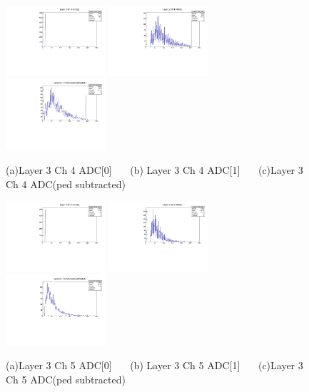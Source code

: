 \documentclass[a4paper,11pt]{article}
\theoremstyle{mytheor}
\begin{document}
\begin{figure}[H] 
\vspace*{-0.3cm} 
\includegraphics[width=0.33\textwidth,scale=0.5,trim=0 0 0 0,clip]{plotsdir/file0_muons-Layer3_Ch4_adc0-1.pdf} 
\includegraphics[width=0.33\textwidth,scale=0.5,trim=0 0 0 0,clip]{plotsdir/file0_muons-Layer3_Ch4_adc1-1.pdf} 
\includegraphics[width=0.33\textwidth,scale=0.5,trim=0 0 0 0,clip]{plotsdir/file0_muons-Layer3_Ch4_adcPedsub-1.pdf} 
\caption{(a)Layer 3 Ch 4 ADC[0] ~~~(b) Layer 3 Ch 4 ADC[1] ~~~(c)Layer 3 Ch 4 ADC(ped subtracted) } 
\end{figure} 
\begin{figure}[H] 
\vspace*{-0.3cm} 
\includegraphics[width=0.33\textwidth,scale=0.5,trim=0 0 0 0,clip]{plotsdir/file0_muons-Layer3_Ch5_adc0-1.pdf} 
\includegraphics[width=0.33\textwidth,scale=0.5,trim=0 0 0 0,clip]{plotsdir/file0_muons-Layer3_Ch5_adc1-1.pdf} 
\includegraphics[width=0.33\textwidth,scale=0.5,trim=0 0 0 0,clip]{plotsdir/file0_muons-Layer3_Ch5_adcPedsub-1.pdf} 
\caption{(a)Layer 3 Ch 5 ADC[0] ~~~(b) Layer 3 Ch 5 ADC[1] ~~~(c)Layer 3 Ch 5 ADC(ped subtracted) } 
\end{figure} 
\end{document}
